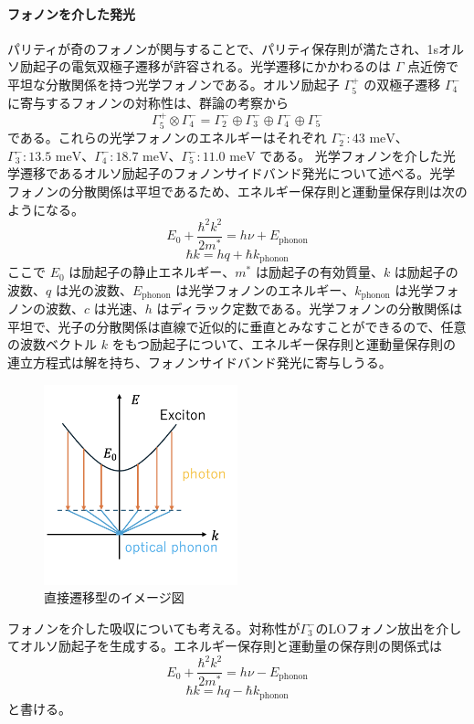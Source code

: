 \paragraph{フォノンを介した発光}
パリティが奇のフォノンが関与することで、パリティ保存則が満たされ、1sオルソ励起子の電気双極子遷移が許容される。光学遷移にかかわるのは $\Gamma$ 点近傍で平坦な分散関係を持つ光学フォノンである。オルソ励起子 $\Gamma_5^+$ の双極子遷移 $\Gamma_4^-$ に寄与するフォノンの対称性は、群論の考察から \[ \Gamma_5^+ \otimes \Gamma_4^- = \Gamma_2^- \oplus \Gamma_3^- \oplus \Gamma_4^- \oplus \Gamma_5^- \tag{2.8} \] である。これらの光学フォノンのエネルギーはそれぞれ $\Gamma_2^-: 43 \text{ meV}$、$\Gamma_3^-: 13.5 \text{ meV}$、$\Gamma_4^-: 18.7 \text{ meV}$、$\Gamma_5^-: 11.0 \text{ meV}$ である。 
光学フォノンを介した光学遷移であるオルソ励起子のフォノンサイドバンド発光について述べる。光学フォノンの分散関係は平坦であるため、エネルギー保存則と運動量保存則は次のようになる。
\[ E_0 + \frac{\hbar^2 k^2}{2m^*} = h\nu + E_{\text{phonon}} \tag{2.9} \] \[ \hbar k = hq + \hbar k_{\text{phonon}} \tag{2.10} \] ここで $E_0$ は励起子の静止エネルギー、$m^*$ は励起子の有効質量、$k$ は励起子の波数、$q$ は光の波数、$E_{\text{phonon}}$ は光学フォノンのエネルギー、$k_{\text{phonon}}$ は光学フォノンの波数、$c$ は光速、$h$ はディラック定数である。光学フォノンの分散関係は平坦で、光子の分散関係は直線で近似的に垂直とみなすことができるので、任意の波数ベクトル $k$ をもつ励起子について、エネルギー保存則と運動量保存則の連立方程式は解を持ち、フォノンサイドバンド発光に寄与しうる。
\begin{figure}[htbp]
\centering
\includegraphics[width=0.5\textwidth]{Screenshoot_2024-08-18_0.21.08.png}
\caption{直接遷移型のイメージ図}
\label{fig:直接遷移}
\end{figure}
フォノンを介した吸収についても考える。対称性が$\Gamma_3^-$のLOフォノン放出を介してオルソ励起子を生成する。エネルギー保存則と運動量の保存則の関係式は
\[ E_0 + \frac{\hbar^2 k^2}{2m^*} = h\nu - E_{\text{phonon}} \tag{2.9} \] \[ \hbar k = hq - \hbar k_{\text{phonon}} \tag{2.10} \] 
と書ける。


